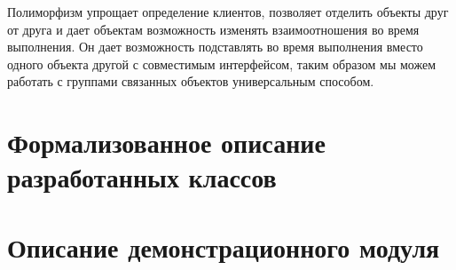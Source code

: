 \documentclass[russian,utf8,simple,hpadding=10mm,vpadding=20mm]{eskdtext}
\begin{document}
Полиморфизм упрощает определение клиентов, позволяет отделить объекты друг от друга и дает объектам возможность изменять взаимоотношения во время выполнения. Он дает возможность подставлять во время выполнения вместо одного объекта другой с совместимым интерфейсом, таким образом мы можем работать с группами связанных объектов универсальным способом.

\newpage
\parindent=15mm
\doublespacing
\section{Формализованное описание разработанных классов}

\renewcommand{\lstlistingname}{Класс}
















\newpage
\parindent=15mm
\section{Описание демонстрационного модуля}
\end{document}
